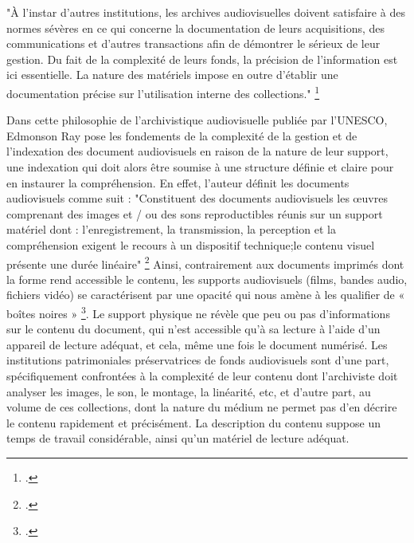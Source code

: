 
"À l’instar d’autres institutions, les archives audiovisuelles doivent satisfaire à des normes sévères en ce qui concerne la documentation de leurs acquisitions, des communications et d’autres transactions afin de démontrer le sérieux de leur gestion. Du fait de la complexité de leurs fonds, la précision de l’information est ici essentielle. La nature des matériels impose en outre d’établir une documentation précise sur l’utilisation interne des collections." \footcite{zotero-item-772} 

Dans cette philosophie de l'archivistique audiovisuelle publiée par l'UNESCO, Edmonson Ray pose les fondements de la complexité de la gestion et de l'indexation des document audiovisuels en raison de la nature de leur support, une indexation qui doit alors être soumise à une structure définie et claire pour en instaurer la compréhension. En effet, l'auteur définit les documents audiovisuels comme suit : 
"Constituent des documents audiovisuels les œuvres comprenant des images et / ou des sons reproductibles réunis sur un support matériel dont : l’enregistrement, la transmission, la perception et la compréhension exigent le recours à un dispositif technique;le contenu visuel présente une durée linéaire"
\footcite{zotero-item-772}
Ainsi, contrairement aux documents imprimés dont la forme rend accessible le contenu, les supports audiovisuels (films, bandes audio, fichiers vidéo) se caractérisent par une opacité qui nous amène à les qualifier de « boîtes noires » \footcite{zotero-item-582}. Le support physique ne révèle que peu ou pas d'informations sur le contenu du document, qui n'est accessible qu'à sa lecture à l'aide d'un appareil de lecture adéquat, et cela, même une fois le document numérisé. Les institutions patrimoniales préservatrices de fonds audiovisuels sont d'une part, spécifiquement confrontées à la complexité de leur contenu dont l'archiviste doit analyser les images, le son, le montage, la linéarité, etc, et d'autre part, au volume de ces collections, dont la nature du médium ne permet pas d'en décrire le contenu rapidement et précisément. La description du contenu suppose un temps de travail considérable, ainsi qu'un matériel de lecture adéquat. 
